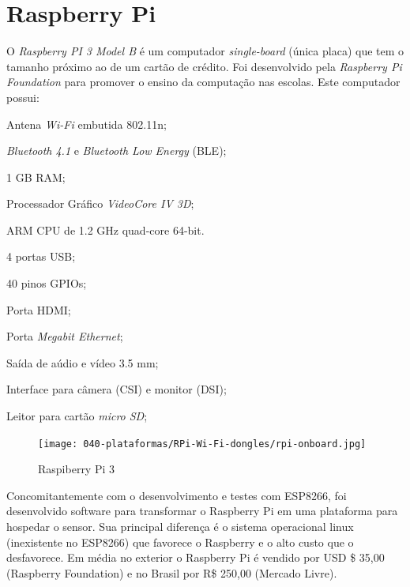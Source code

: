 \section{Raspberry Pi}
\label{sec:Raspberry-Pi}

O \emph{Raspberry PI 3 Model B} é um computador \emph{single-board}  (única
placa) que tem o tamanho próximo ao de um cartão de crédito. Foi desenvolvido
pela \emph{Raspberry Pi Foundation} para promover o ensino da computação nas escolas.
Este computador possui:


\begin{alineas}
	\item Antena \emph{Wi-Fi} embutida 802.11n;

	\item \emph{Bluetooth 4.1} e \emph{Bluetooth Low Energy} (BLE);

	\item 1 GB RAM;

	\item Processador Gráfico \emph{VideoCore IV 3D};

	\item ARM CPU de 1.2 GHz quad-core 64-bit.

	\item 4 portas USB;

	\item 40 pinos GPIOs;

	\item Porta HDMI;

	\item Porta \emph{Megabit Ethernet};

	\item Saída de aúdio e vídeo 3.5 mm;

	\item Interface para câmera (CSI) e monitor (DSI);

	\item Leitor para cartão \emph{micro SD};

\end{alineas}

\begin{figure}[htb]
	\caption{\label{fig:rpi-3}Raspiberry Pi 3 }
	\begin{center}
		\texttt{[image: 040-plataformas/RPi-Wi-Fi-dongles/rpi-onboard.jpg]}
	\end{center}
\end{figure}

Concomitantemente com o desenvolvimento e testes com ESP8266, foi desenvolvido
software para transformar o Raspberry Pi em uma plataforma para hospedar o
sensor. Sua principal diferença é o sistema operacional linux (inexistente no
ESP8266) que favorece o Raspberry e o alto custo que o desfavorece. Em média no
exterior o Raspberry Pi é vendido por USD \$ 35,00 (Raspberry Foundation)
e no Brasil por R\$ 250,00 (Mercado Livre).

